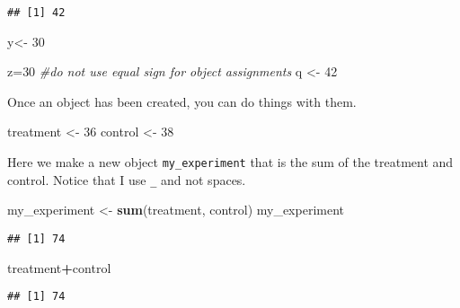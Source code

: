 \documentclass[
]{article}
\newenvironment{Shaded}{\begin{snugshade}}{\end{snugshade}}
\newcommand{\CommentTok}[1]{\textcolor[rgb]{0.56,0.35,0.01}{\textit{#1}}}
\newcommand{\DecValTok}[1]{\textcolor[rgb]{0.00,0.00,0.81}{#1}}
\newcommand{\FunctionTok}[1]{\textcolor[rgb]{0.13,0.29,0.53}{\textbf{#1}}}
\newcommand{\NormalTok}[1]{#1}
\newcommand{\OtherTok}[1]{\textcolor[rgb]{0.56,0.35,0.01}{#1}}
\newcommand{\SpecialCharTok}[1]{\textcolor[rgb]{0.81,0.36,0.00}{\textbf{#1}}}
\begin{document}
\begin{verbatim}
## [1] 42
\end{verbatim}

\begin{Shaded}
\begin{Highlighting}[]
\NormalTok{y}\OtherTok{\textless{}{-}} \DecValTok{30} 
\end{Highlighting}
\end{Shaded}

\begin{Shaded}
\begin{Highlighting}[]
\NormalTok{z}\OtherTok{=}\DecValTok{30} \CommentTok{\#do not use equal sign for object assignments }
\NormalTok{q }\OtherTok{\textless{}{-}} \DecValTok{42}
\end{Highlighting}
\end{Shaded}

Once an object has been created, you can do things with them.

\begin{Shaded}
\begin{Highlighting}[]
\NormalTok{treatment }\OtherTok{\textless{}{-}} \DecValTok{36}
\NormalTok{control }\OtherTok{\textless{}{-}} \DecValTok{38}
\end{Highlighting}
\end{Shaded}

Here we make a new object \texttt{my\_experiment} that is the sum of the
treatment and control. Notice that I use \texttt{\_} and not spaces.

\begin{Shaded}
\begin{Highlighting}[]
\NormalTok{my\_experiment }\OtherTok{\textless{}{-}} \FunctionTok{sum}\NormalTok{(treatment, control)}
\NormalTok{my\_experiment}
\end{Highlighting}
\end{Shaded}

\begin{verbatim}
## [1] 74
\end{verbatim}

\begin{Shaded}
\begin{Highlighting}[]
\NormalTok{treatment}\SpecialCharTok{+}\NormalTok{control}
\end{Highlighting}
\end{Shaded}

\begin{verbatim}
## [1] 74
\end{verbatim}
\end{document}
